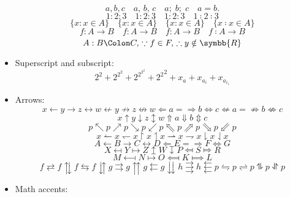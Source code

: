 \documentclass { article }
\begin{document}
\begin{itemize}
\[        \]
        \[ a, b, c \quad a ,\, b ,\, c \quad a ;\; b ;\; c \quad a = b. \]
        \[
          1 :          2 :          3 \quad
          1 \colon     2 \colon     3 \quad
          1 \mathcolon 2 \mathcolon 3 \quad
          1 \mathratio 2 \mathratio 3
        \]
        \[
          \{ x :          x \in A \} \quad
          \{ x \colon     x \in A \} \quad
          \{ x \mathcolon x \in A \} \quad
          \{ x \mathratio x \in A \}
        \]
        \[
          f :          A \to B \quad
          f \colon     A \to B \quad
          f \mathcolon A \to B \quad
          f \mathratio A \to B
        \]
        \[ A : B \Colon C, \, \because f \in F, \, \therefore y \notin \symbb{R} \]
  \item Superscript and subscript:
        \[ 2^2 + 2^{2^2} + 2^{2^{2^2}} + {2^2}^2 + x_a + x_{a_i} + x_{a_{i_1}} \]
  \item Arrows:
        \[
          x \leftarrow  y   \rightarrow  z \leftrightarrow  w
            \nleftarrow y   \nrightarrow z \nleftrightarrow w
            \Leftarrow  a = \Rightarrow  b \Leftrightarrow  c
            \nLeftarrow a = \nRightarrow b \nLeftrightarrow c
        \]
        \[
          x \uparrow   y \downarrow  z \updownarrow    w
            \Uparrow   a \Downarrow  b \Updownarrow    c
        \]
        \[
          p \nwarrow p \nearrow p \searrow p \swarrow p
            \Nwarrow p \Nearrow p \Searrow p \Swarrow p
        \]
        \[
          x \leftharpoonup    x \leftharpoondown  x
            \upharpoonright   x \upharpoonleft    x
            \rightharpoonup   x \rightharpoondown x
            \downharpoonright x \downharpoonleft  x
        \]
        \[
          A \longleftarrow B   \longrightarrow C \longleftrightarrow D
            \Longleftarrow E = \Longrightarrow F \Longleftrightarrow G
        \]
        \[
          X \mapsfrom Y \mapsto Z \mapsup W \mapsdown P \Mapsfrom S \Mapsto R
        \]
        \[
          M \longmapsfrom N \longmapsto O \Longmapsfrom K \Longmapsto L
        \]
        \[
          f \rightleftarrows  f \updownarrows f \leftrightarrows f \downuparrows
          g \rightrightarrows g \upuparrows   g \leftleftarrows  g \downdownarrows
          h \rightthreearrows h \leftthreearrows
          p \leftrightharpoons       p \rightleftharpoons
          p \updownharpoonsleftright p \downupharpoonsleftright p
        \]
  \item Math accents:

\end{itemize}
\end{document}

